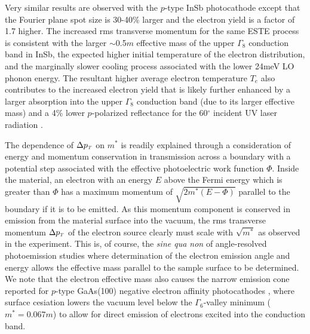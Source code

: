 Very similar results are observed with the $p$-type InSb photocathode except that the Fourier plane spot size is 30-40\%  larger and the electron yield is a factor of 1.7 higher.
The increased rms transverse momentum for the same ESTE process is consistent with the larger $\sim$0.5$m$ effective mass of the upper $\Gamma_8$ conduction band in InSb, the expected higher initial temperature of the electron distribution, and the marginally slower cooling process associated with the lower 24meV LO phonon energy.
The resultant higher average electron temperature $T_e$ also contributes to the increased electron yield that is likely further enhanced by a larger absorption into the upper $\Gamma_8$ conduction band (due to its larger effective mass) and a 4\% lower $p$-polarized reflectance for the 60$^{\circ}$ incident UV laser radiation \cite{aspnes_dielectric_1983}. 

The dependence of $\Delta p_{{\scriptscriptstyle T}}$ on $m^*$ is readily explained through a consideration of energy and momentum conservation in transmission across a boundary with a potential step associated with the effective photoelectric work function $\Phi$.
Inside the material, an electron with an energy $E$ above the Fermi energy which is greater than $\Phi$ has a maximum momentum of $\sqrt{2 m^* (E-\Phi) }$ parallel to the boundary if it is to be emitted.
As this momentum component is conserved in emission from the material surface into the vacuum, the rms transverse momentum $\Delta p_{{\scriptscriptstyle T}}$ of the electron source clearly must scale with $\sqrt{m^*}$ as observed in the experiment.
This is, of course, the \textit{sine qua non} of angle-resolved photoemission studies \cite{himpsel_angle-resolved_1983} where determination of the electron emission angle and energy allows the effective mass parallel to the sample surface to be determined.
We note that the electron effective mass also causes the narrow emission cone reported for $p$-type GaAs(100) negative electron affinity photocathodes \cite{liu_narrow_2005}, where surface cesiation lowers the vacuum level below the $\Gamma_6$-valley minimum ($m^* = 0.067m$)  to allow for direct emission of electrons excited into the conduction band.

